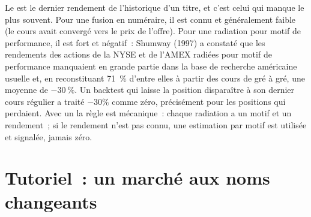 Le  est le dernier rendement de l'historique d'un titre, et c'est celui qui manque le plus souvent. Pour une fusion en numéraire, il est
connu et généralement faible (le cours avait convergé vers le prix de l'offre). Pour une radiation pour motif de performance, il est fort et négatif~: Shumway
(1997) a constaté que les rendements des actions de la NYSE et de l'AMEX radiées pour motif de performance manquaient en grande partie dans la base de recherche
américaine usuelle et, en reconstituant 71~\% d'entre elles à partir des cours de gré à gré, une moyenne de $-30~\%$. Un backtest qui laisse la position
disparaître à son dernier cours régulier a traité $-30\%$ comme zéro, précisément pour les positions qui perdaient. Avec un 
la règle est mécanique~: chaque radiation a un motif et un rendement~; si le rendement n'est pas connu, une estimation par motif est utilisée et
signalée, jamais zéro.

\section{Tutoriel~: un marché aux noms changeants}\label{tut:rs:universe-symbology-and-corporate-actions:master}

